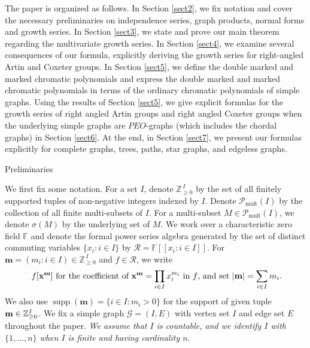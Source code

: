 \documentclass[11pt,reqno]{amsart}
\makeatletter
\numberwithin{equation}{section} %
\theoremstyle{definition}
\theoremstyle{remark}
\newcommand{\supp}{\operatorname{supp}}
\numberwithin{equation}{section}
\def\section{\def\@secnumfont{\mdseries}\@startsection{section}{1}%
  \z@{.7\linespacing\@plus\linespacing}{.5\linespacing}%
  {\normalfont\scshape\centering}}
\makeatother
\begin{document}
The paper is organized as follows. In Section \ref{sect2}, we fix notation and cover the necessary preliminaries on independence series, graph products, normal forms and growth series. In Section \ref{sect3}, we state and prove our main theorem regarding the multivariate growth series. In Section \ref{sect4}, we examine several consequences of our formula, explicitly deriving the growth series for right-angled Artin and Coxeter groups.
In Section \ref{sect5}, we define the double marked and marked chromatic polynomials and express the double marked and marked chromatic polynomials in terms of the ordinary chromatic polynomials of simple graphs. Using the results of Section \ref{sect5}, we give explicit formulas for the growth series of right angled Artin groups and right angled Coxeter groups when the underlying simple graphs are $PEO$-graphs (which includes the chordal graphs) in Section \ref{sect6}. At the end, in Section \ref{sect7}, we present our formulas explicitly for complete graphs, trees, paths, star graphs, and edgeless graphs.


\section{Preliminaries}\label{sect2}

We first fix some notation.
For a set \(I\), denote \(\mathbb{Z}_{\ge 0}^{\,I}\) by the set of all finitely supported tuples of non-negative integers indexed by \(I\). Denote
$\mathcal{P}_{\mathrm{mult}}(I)$ by the collection of all finite multi-subsets of \(I\). For a multi-subset $M\in \mathcal{P}_{\mathrm{mult}}(I)$, we denote $\sigma(M)$ by the underlying set of $M$. 
We work over a characteristic zero field $\mathbb F$ and denote the formal power series algebra generated by 
 the set of distinct commuting variables $\{x_i : i\in I\}$ by $\mathcal R =\mathbb F[[x_i: i\in I]]$.  For \(\mathbf{m}=(m_i : i\in I)\in \mathbb{Z}_{\ge 0}^{\,I}\) and \(f\in \mathcal R\), we write $$\text{
$
f[\mathbf{x}^{\mathbf{m}}]$
for the coefficient of
$\mathbf{x}^{\mathbf{m}}
=
\prod_{i\in I} x_i^{m_i}$ in \(f\),\ $ \text{and set} \ |\mathbf{m}| = \sum_{i \in I} m_i$}.$$
We also use $\supp(\mathbf{m}) = \{i \in I : m_i > 0\}$ for the support of given tuple $\bold m\in \mathbb Z_{\ge 0}^I$.
We fix a simple graph $\mathcal G=(I, E)$ with vertex set $I$ and edge set $E$ throughout the paper. \textit{We assume that $I$ is countable, and we identify $I$ with $\{1, \dots, n\}$ when $I$ is finite and having cardinality $n.$ }
\end{document}
